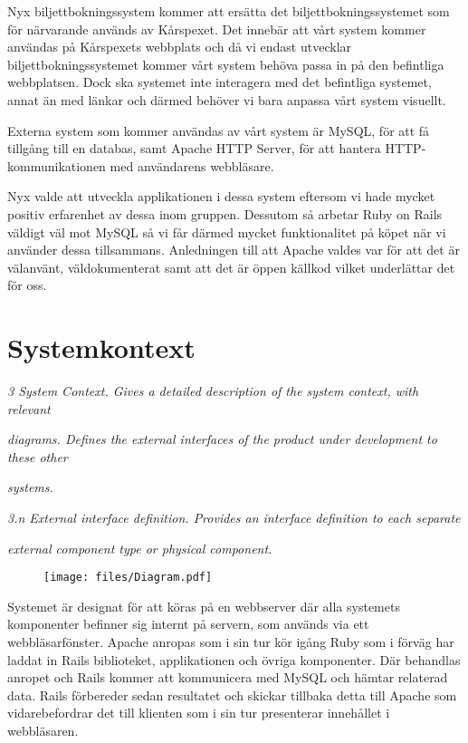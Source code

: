 \documentclass[a4paper, twoside, 11pt, titlepage]{article}
\begin{document}
Nyx biljettbokningssystem kommer att ersätta det biljettbokningssystemet som för närvarande används av Kårspexet. Det innebär att vårt system kommer användas på Kårspexets webbplats och då vi endast utvecklar biljettbokningssystemet kommer vårt system behöva passa in på den befintliga webbplatsen. Dock ska systemet inte interagera med det befintliga systemet, annat än med länkar och därmed behöver vi bara anpassa vårt system visuellt.

Externa system som kommer användas av vårt system är MySQL, för att få tillgång till en databas, samt Apache HTTP Server, för att hantera HTTP-kommunikationen med användarens webbläsare.

Nyx valde att utveckla applikationen i dessa system eftersom vi hade mycket positiv erfarenhet av dessa inom gruppen. Dessutom så arbetar Ruby on Rails väldigt väl mot MySQL så vi får därmed mycket funktionalitet på köpet när vi använder dessa tillsammans. Anledningen till att Apache valdes var för att det är välanvänt, väldokumenterat samt att det är öppen källkod vilket underlättar det för oss.

\clearpage
\section{Systemkontext}


\emph{3 System Context. Gives a detailed description of the system context, with relevant}

\emph{diagrams. Defines the external interfaces of the product under development to these other}

\emph{systems.}

\emph{3.n External interface definition. Provides an interface definition to each separate}

\emph{external component type or physical component.}

\begin{figure}[ht] \centering \texttt{[image: files/Diagram.pdf]} \end{figure} \FloatBarrier

Systemet är designat för att köras på en webbserver där alla systemets komponenter befinner sig internt  på servern, som används via ett webbläsarfönster. Apache anropas som i sin tur kör igång Ruby som i förväg har laddat in Rails biblioteket, applikationen och övriga komponenter. Där behandlas anropet och Rails kommer att kommunicera med MySQL och hämtar relaterad data. Rails förbereder sedan resultatet och skickar tillbaka detta till Apache som vidarebefordrar det till klienten som i sin tur presenterar innehållet i webbläsaren.
\end{document}
